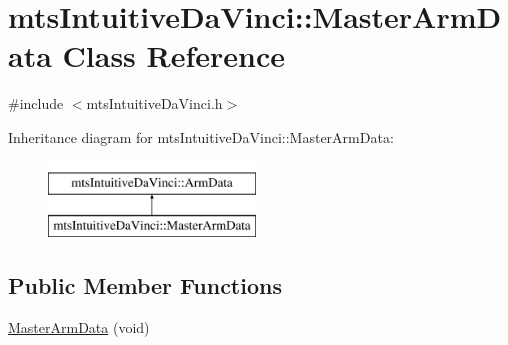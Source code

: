 \hypertarget{classmts_intuitive_da_vinci_1_1_master_arm_data}{}\section{mts\+Intuitive\+Da\+Vinci\+:\+:Master\+Arm\+Data Class Reference}
\label{classmts_intuitive_da_vinci_1_1_master_arm_data}


{\ttfamily \#include $<$mts\+Intuitive\+Da\+Vinci.\+h$>$}

Inheritance diagram for mts\+Intuitive\+Da\+Vinci\+:\+:Master\+Arm\+Data\+:\begin{figure}[H]
\begin{center}
\leavevmode
\includegraphics[height=2.000000cm]{d7/d75/classmts_intuitive_da_vinci_1_1_master_arm_data}
\end{center}
\end{figure}
\subsection*{Public Member Functions}
\begin{DoxyCompactItemize}
\item 
\hyperlink{classmts_intuitive_da_vinci_1_1_master_arm_data_a5dbd5ea0c9462f8ce324c9b5a0f8521c}{Master\+Arm\+Data} (void)
\end{DoxyCompactItemize}
